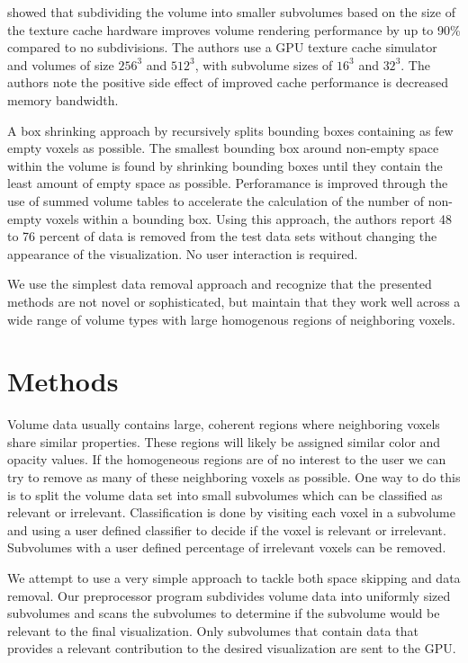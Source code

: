 \documentclass[journal]{vgtc}                %
\begin{document}
\cite{Lee2004} showed that subdividing the volume into smaller subvolumes based
on the size of the texture cache hardware improves volume rendering performance
by up to 90\% compared to no subdivisions. The authors use a GPU texture cache
simulator and volumes of size $256^3$ and $512^3$, with subvolume sizes
of $16^3$ and $32^3$. The authors note the positive side effect of improved 
cache performance is decreased memory bandwidth. 

A box shrinking approach by \cite{Vidal2008} recursively splits bounding
boxes containing as few empty voxels as possible. The smallest bounding box
around non-empty space within the volume is found by shrinking bounding
boxes until they contain the least amount of empty space as possible. 
Perforamance is improved through the use of summed volume tables to accelerate 
the calculation of the number of 
non-empty voxels within a bounding box. Using this approach, the authors
report 48 to 76 percent of data is removed from the test data sets without
changing the appearance of the visualization. No user interaction is required.

We use the simplest data removal approach and recognize that the presented
methods are not novel or sophisticated, but maintain that they work well
across a wide range of volume types with large homogenous regions of neighboring
voxels.

\section{Methods}

Volume data usually contains large, coherent regions where neighboring voxels
share similar properties. These regions will likely be assigned similar color
and opacity values. If the homogeneous regions are of no interest to the user
we can try to remove as many of these neighboring voxels as possible.
One way to do this is to split the volume data set into small 
subvolumes which can be classified as relevant or irrelevant. Classification
is done by visiting each voxel in a subvolume and using a user defined 
classifier to decide if the voxel is relevant or irrelevant. Subvolumes with a
user defined percentage of irrelevant voxels can be removed.

We attempt to use a very simple approach to tackle both space skipping and 
data removal. Our preprocessor program subdivides volume data into uniformly
sized subvolumes and scans the subvolumes to determine if the subvolume
would be relevant to the final visualization. Only subvolumes that contain
data that provides a relevant contribution to the desired visualization are
sent to the GPU.
\end{document}
